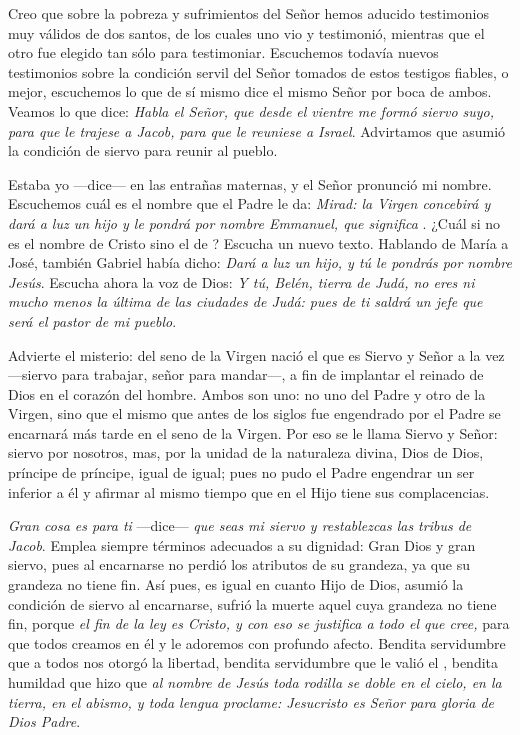 					\begin{body}
						Creo que sobre la pobreza y sufrimientos del Señor hemos aducido testimonios muy válidos de dos santos, de los cuales uno vio y testimonió, mientras que el otro fue elegido tan sólo para testimoniar. Escuchemos todavía nuevos testimonios sobre la condición servil del Señor tomados de estos testigos fiables, o mejor, escuchemos lo que de sí mismo dice el mismo Señor por boca de ambos. Veamos lo que dice: \emph{Habla el Señor, que desde el vientre me formó siervo suyo, para que le trajese a Jacob, para que le reuniese a Israel}. Advirtamos que asumió la condición de siervo para reunir al pueblo.
						
						Estaba yo ---dice--- en las entrañas maternas, y el Señor pronunció mi nombre. Escuchemos cuál es el nombre que el Padre le da: \emph{Mirad: la Virgen concebirá y dará a luz un hijo y le pondrá por nombre Emmanuel, que significa }. ¿Cuál si no es el nombre de Cristo sino el de ? Escucha un nuevo texto. Hablando de María a José, también Gabriel había dicho: \emph{Dará a luz un hijo, y tú le pondrás por nombre Jesús}. Escucha ahora la voz de Dios: \emph{Y tú, Belén, tierra de Judá, no eres ni mucho menos la última de las ciudades de Judá: pues de ti saldrá un jefe que será el pastor de mi pueblo}.
						
						Advierte el misterio: del seno de la Virgen nació el que es Siervo y Señor a la vez ---siervo para trabajar, señor para mandar---, a fin de implantar el reinado de Dios en el corazón del hombre. Ambos son uno: no uno del Padre y otro de la Virgen, sino que el mismo que antes de los siglos fue engendrado por el Padre se encarnará más tarde en el seno de la Virgen. Por eso se le llama Siervo y Señor: siervo por nosotros, mas, por la unidad de la naturaleza divina, Dios de Dios, príncipe de príncipe, igual de igual; pues no pudo el Padre engendrar un ser inferior a él y afirmar al mismo tiempo que en el Hijo tiene sus complacencias.
						
						\emph{Gran cosa es para ti} ---dice--- \emph{que seas mi siervo y restablezcas las tribus de Jacob}. Emplea siempre términos adecuados a su dignidad: Gran Dios y gran siervo, pues al encarnarse no perdió los atributos de su grandeza, ya que su grandeza no tiene fin. Así pues, es igual en cuanto Hijo de Dios, asumió la condición de siervo al encarnarse, sufrió la muerte aquel cuya grandeza no tiene fin, porque \emph{el fin de la ley es Cristo, y con eso se justifica a todo el que cree,} para que todos creamos en él y le adoremos con profundo afecto. Bendita servidumbre que a todos nos otorgó la libertad, bendita servidumbre que le valió el , bendita humildad que hizo que \emph{al nombre de Jesús toda rodilla se doble en el cielo, en la tierra, en el abismo, y toda lengua proclame: Jesucristo es Señor para gloria de Dios Padre}.
					\end{body}
				
